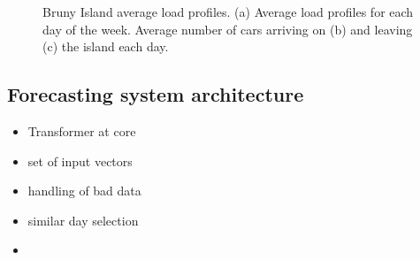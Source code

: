 \begin{figure}[htbp]
	\centering
	\vfil
	\vfil
	\caption{Bruny Island average load profiles. (a) Average load profiles for each day of the week. Average number of cars arriving on (b) and leaving (c) the island each day.}
	\label{fig:average-load-profiles}
\end{figure}

\subsection{Forecasting system architecture}
\begin{itemize}
	\item Transformer at core
	\item set of input vectors
	\item handling of bad data
	\item similar day selection
	\item 
\end{itemize}